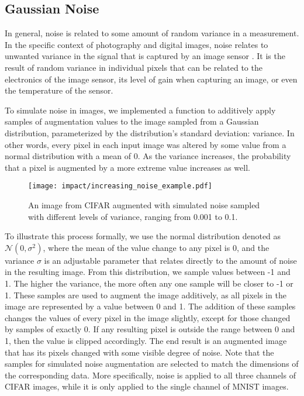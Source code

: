 \documentclass[conference]{IEEEtran}
\begin{document}
\subsection{Gaussian Noise}

In general, noise is related to some amount of random variance in a measurement. In the specific context of photography and digital images, noise relates to unwanted variance in the signal that is captured by an image sensor \cite{photoencyc}. It is the result of random variance in individual pixels that can be related to the electronics of the image sensor, its level of gain when capturing an image, or even the temperature of the sensor.

To simulate noise in images, we implemented a function to additively apply samples of augmentation values to the image sampled from a Gaussian distribution, parameterized by the distribution’s standard deviation: variance. In other words, every pixel in each input image was altered by some value from a normal distribution with a mean of 0. As the variance increases, the probability that a pixel is augmented by a more extreme value increases as well.

\begin{figure}[!b]
    \centering
    \texttt{[image: impact/increasing\_noise\_example.pdf]}
    \captionsetup{width=0.90\columnwidth}
    \caption{An image from CIFAR augmented with simulated noise sampled with different levels of variance, ranging from 0.001 to 0.1.}
    \label{fig:increasing_noise}
\end{figure}

To illustrate this process formally, we use the normal distribution denoted as $\mathcal{N} (0, \sigma^2)$, where the mean of the value change to any pixel is 0, and the variance $\sigma$ is an adjustable parameter that relates directly to the amount of noise in the resulting image. From this distribution, we sample values between -1 and 1. The higher the variance, the more often any one sample will be closer to -1 or 1. These samples are used to augment the image additively, as all pixels in the image are represented by a value between 0 and 1. The addition of these samples changes the values of every pixel in the image slightly, except for those changed by samples of exactly 0. If any resulting pixel is outside the range between 0 and 1, then the value is clipped accordingly. The end result is an augmented image that has its pixels changed with some visible degree of noise. Note that the samples for simulated noise augmentation are selected to match the dimensions of the corresponding data. More specifically, noise is applied to all three channels of CIFAR images, while it is only applied to the single channel of MNIST images.
\end{document}
